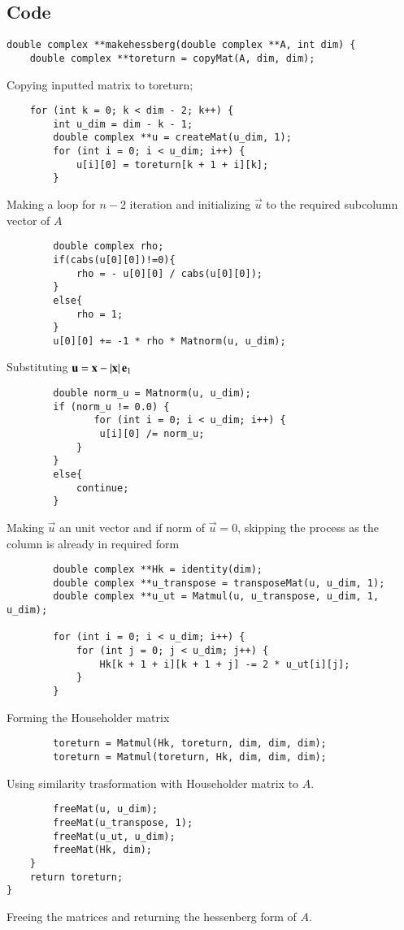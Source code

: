 \documentclass[a4paper,12pt]{article}
\theoremstyle{remark}
\begin{document}
\subsection{Code}
\begin{verbatim}
double complex **makehessberg(double complex **A, int dim) {
    double complex **toreturn = copyMat(A, dim, dim);
\end{verbatim}
Copying inputted matrix to toreturn;
\begin{verbatim}
    for (int k = 0; k < dim - 2; k++) {
        int u_dim = dim - k - 1;
        double complex **u = createMat(u_dim, 1);
        for (int i = 0; i < u_dim; i++) {
            u[i][0] = toreturn[k + 1 + i][k];
        }
\end{verbatim}
Making a loop for $n-2$ iteration and initializing $\vec{u}$ to the required subcolumn vector of $A$ 
\begin{verbatim}        
        double complex rho;
        if(cabs(u[0][0])!=0){
        	rho = - u[0][0] / cabs(u[0][0]);
        }
        else{
        	rho = 1;
        }
        u[0][0] += -1 * rho * Matnorm(u, u_dim);
\end{verbatim}
Substituting $\mathbf{u}=\mathbf{x}-\left\vert\mathbf{x}\right\vert\mathbf{e}_1$
\begin{verbatim}
        double norm_u = Matnorm(u, u_dim);
        if (norm_u != 0.0) {
         	   for (int i = 0; i < u_dim; i++) {
                u[i][0] /= norm_u;
            }
        }
        else{
        	continue;
        }
\end{verbatim}
Making $\vec{u}$ an unit vector and if norm of $\vec{u}=0$, skipping the process as the column is already in required form
\begin{verbatim}
        double complex **Hk = identity(dim);
        double complex **u_transpose = transposeMat(u, u_dim, 1);
        double complex **u_ut = Matmul(u, u_transpose, u_dim, 1, u_dim);

        for (int i = 0; i < u_dim; i++) {
            for (int j = 0; j < u_dim; j++) {
                Hk[k + 1 + i][k + 1 + j] -= 2 * u_ut[i][j];
            }
        }
\end{verbatim}
Forming the Householder matrix
\begin{verbatim}
        toreturn = Matmul(Hk, toreturn, dim, dim, dim);
        toreturn = Matmul(toreturn, Hk, dim, dim, dim);
\end{verbatim}
Using similarity trasformation with Householder matrix to $A$.
\begin{verbatim}
        freeMat(u, u_dim);
        freeMat(u_transpose, 1);
        freeMat(u_ut, u_dim);
        freeMat(Hk, dim);
    }
    return toreturn;
}
\end{verbatim}
Freeing the matrices and returning the hessenberg form of $A$.
\end{document}
